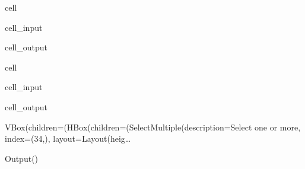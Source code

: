 \documentclass[letterpaper,10pt,english]{jupyterBook}
\begin{document}
\begin{sphinxuseclass}{cell}\begin{sphinxVerbatimInput}

\begin{sphinxuseclass}{cell_input}
\begin{sphinxVerbatim}[commandchars=\\\{\}]
\end{sphinxVerbatim}

\end{sphinxuseclass}\end{sphinxVerbatimInput}
\begin{sphinxVerbatimOutput}

\begin{sphinxuseclass}{cell_output}
\noindent{}

\noindent{}

\end{sphinxuseclass}\end{sphinxVerbatimOutput}

\end{sphinxuseclass}
\begin{sphinxuseclass}{cell}\begin{sphinxVerbatimInput}

\begin{sphinxuseclass}{cell_input}
\begin{sphinxVerbatim}[commandchars=\\\{\}]
\end{sphinxVerbatim}

\end{sphinxuseclass}\end{sphinxVerbatimInput}
\begin{sphinxVerbatimOutput}

\begin{sphinxuseclass}{cell_output}
\begin{sphinxVerbatim}[commandchars=\\\{\}]
VBox(children=(HBox(children=(SelectMultiple(description=\PYGZsq{}Select one or more\PYGZsq{}, index=(34,), layout=Layout(heig…
\end{sphinxVerbatim}

\begin{sphinxVerbatim}[commandchars=\\\{\}]
Output()
\end{sphinxVerbatim}

\end{sphinxuseclass}\end{sphinxVerbatimOutput}

\end{sphinxuseclass}
\end{document}
